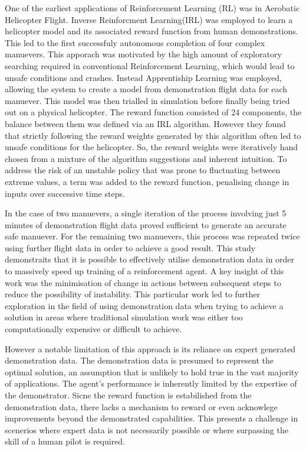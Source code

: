 One of the earliest applications of Reinforcement Learning (RL) was in Aerobatic Helicopter Flight\cite{abbeelRLAerobaticFlight}.
Inverse Reinforcment Learning(IRL) was employed to learn a helicopter model and its associated reward function from human demonstrations.
This led to the first successfuly autonomous completion of four complex manuevers.
This apporach was motivated by the high amount of exploratory searching required in conventional Reinforcement Learning, which would lead to unsafe conditions and crashes.
Instead Apprentiship Learning was employed, allowing the system to create a model from demonstration flight data for each manuever.
This model was then trialled in simulation before finally being tried out on a physical helicopter.
The reward function consisted of 24 components, the balance between them was defined via an IRL algorithm.
However they found that strictly following the reward weights generated by this algorithm often led to unsafe conditions for the helicopter.
So, the reward weights were iteratively hand chosen from a mixture of the algorithm suggestions and inherent intuition. 
To address the risk of an unstable policy that was prone to fluctuating between extreme values, a term was added to the reward function, penalising change in inputs over successive time steps.

In the case of two manuevers, a single iteration of the process involving just 5 minutes of demonstration flight data proved sufficient to generate an accurate safe manuever.
For the remaining two manuevers, this process was repeated twice using further flight data in order to achieve a good result.
This study demonstraits that it is possible to effectively utilise demonstration data in order to massively speed up training of a reinforcement agent.
A key insight of this work was the minimisation of change in actions between subsequent steps to reduce the possibility of instability.
This particular work led to further exploration in the field of using demonstration data when trying to achieve a solution in areas where traditional simulation work was either too computationally expensive or difficult to achieve.

However a notable limitation of this approach is its reliance on expert generated demonstration data.
The demonstration data is presumed to represent the optimal solution, an assumption that is unlikely to hold true in the vast majority of applications.
The agent's performance is inherently limited by the expertise of the demonstrator.
Sicne the reward function is estabilished from the demonstration data, there lacks a mechanism to reward or even acknowlege improvements beyond the demonstrated capabilities.
This presents a challenge in scenerios where expert data is not necessarily possible or where surpassing the skill of a human pilot is required. \\\\

